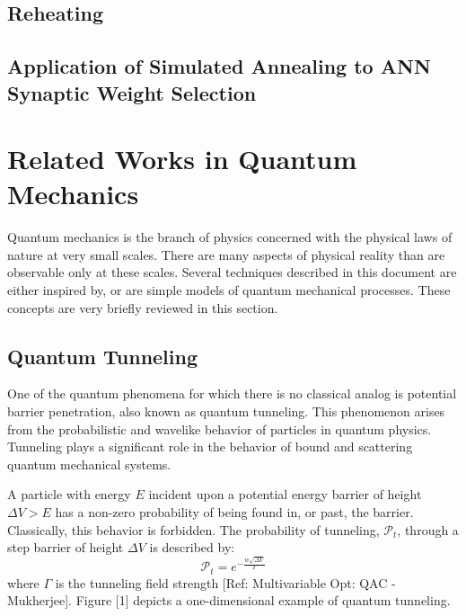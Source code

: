 \documentclass[11pt]{afthesis}
\begin{document}
\subsection{Reheating}

\subsection{Application of Simulated Annealing to ANN Synaptic Weight Selection}


\section{Related Works in Quantum Mechanics}


Quantum mechanics is the branch of physics concerned with the physical laws of nature at very small scales. There are many aspects of physical reality than are observable only at these scales. Several techniques described in this document are either inspired by, or are simple models of quantum mechanical processes. These concepts are very briefly reviewed in this section. 

\subsection{Quantum Tunneling} 



One of the quantum phenomena for which there is no classical analog is potential barrier penetration, also known as quantum tunneling. This phenomenon arises from the probabilistic and wavelike behavior of particles in quantum physics. Tunneling plays a significant role in the behavior of bound and scattering quantum mechanical systems.

A particle with energy \begin{math} E \end{math} incident upon a potential energy barrier of height \begin{math} \Delta V > E  \end{math} has a non-zero probability of being found in, or past, the barrier. Classically, this behavior is forbidden. The probability of tunneling, \begin{math} \mathcal{P}_t \end{math}, through a step barrier of height \begin{math} \Delta V  \end{math} is described by: 
\begin{equation}
\mathcal{P}_t = e^{-\frac{w \sqrt{\Delta V}}{ \Gamma}} 
\end{equation} where \begin{math} \Gamma \end{math} is the tunneling field strength [Ref: Multivariable Opt: QAC - Mukherjee]. Figure [1] depicts a one-dimensional example of quantum tunneling.
\end{document}
